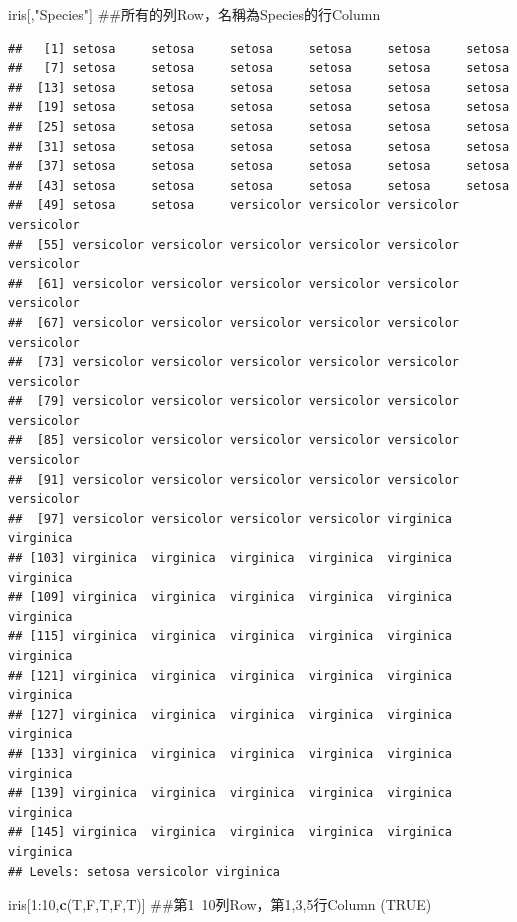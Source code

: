 \documentclass[]{book}
\newenvironment{Shaded}{\begin{snugshade}}{\end{snugshade}}
\newcommand{\KeywordTok}[1]{\textcolor[rgb]{0.13,0.29,0.53}{\textbf{{#1}}}}
\newcommand{\DecValTok}[1]{\textcolor[rgb]{0.00,0.00,0.81}{{#1}}}
\newcommand{\StringTok}[1]{\textcolor[rgb]{0.31,0.60,0.02}{{#1}}}
\newcommand{\NormalTok}[1]{{#1}}
\theoremstyle{definition}
\theoremstyle{definition}
\theoremstyle{remark}
\begin{document}
\begin{Shaded}
\begin{Highlighting}[]
\NormalTok{iris[,}\StringTok{"Species"}\NormalTok{] ##所有的列Row，名稱為Species的行Column}
\end{Highlighting}
\end{Shaded}

\begin{verbatim}
##   [1] setosa     setosa     setosa     setosa     setosa     setosa    
##   [7] setosa     setosa     setosa     setosa     setosa     setosa    
##  [13] setosa     setosa     setosa     setosa     setosa     setosa    
##  [19] setosa     setosa     setosa     setosa     setosa     setosa    
##  [25] setosa     setosa     setosa     setosa     setosa     setosa    
##  [31] setosa     setosa     setosa     setosa     setosa     setosa    
##  [37] setosa     setosa     setosa     setosa     setosa     setosa    
##  [43] setosa     setosa     setosa     setosa     setosa     setosa    
##  [49] setosa     setosa     versicolor versicolor versicolor versicolor
##  [55] versicolor versicolor versicolor versicolor versicolor versicolor
##  [61] versicolor versicolor versicolor versicolor versicolor versicolor
##  [67] versicolor versicolor versicolor versicolor versicolor versicolor
##  [73] versicolor versicolor versicolor versicolor versicolor versicolor
##  [79] versicolor versicolor versicolor versicolor versicolor versicolor
##  [85] versicolor versicolor versicolor versicolor versicolor versicolor
##  [91] versicolor versicolor versicolor versicolor versicolor versicolor
##  [97] versicolor versicolor versicolor versicolor virginica  virginica 
## [103] virginica  virginica  virginica  virginica  virginica  virginica 
## [109] virginica  virginica  virginica  virginica  virginica  virginica 
## [115] virginica  virginica  virginica  virginica  virginica  virginica 
## [121] virginica  virginica  virginica  virginica  virginica  virginica 
## [127] virginica  virginica  virginica  virginica  virginica  virginica 
## [133] virginica  virginica  virginica  virginica  virginica  virginica 
## [139] virginica  virginica  virginica  virginica  virginica  virginica 
## [145] virginica  virginica  virginica  virginica  virginica  virginica 
## Levels: setosa versicolor virginica
\end{verbatim}

\begin{Shaded}
\begin{Highlighting}[]
\NormalTok{iris[}\DecValTok{1}\NormalTok{:}\DecValTok{10}\NormalTok{,}\KeywordTok{c}\NormalTok{(T,F,T,F,T)] ##第1~10列Row，第1,3,5行Column (TRUE)}
\end{Highlighting}
\end{Shaded}
\end{document}
